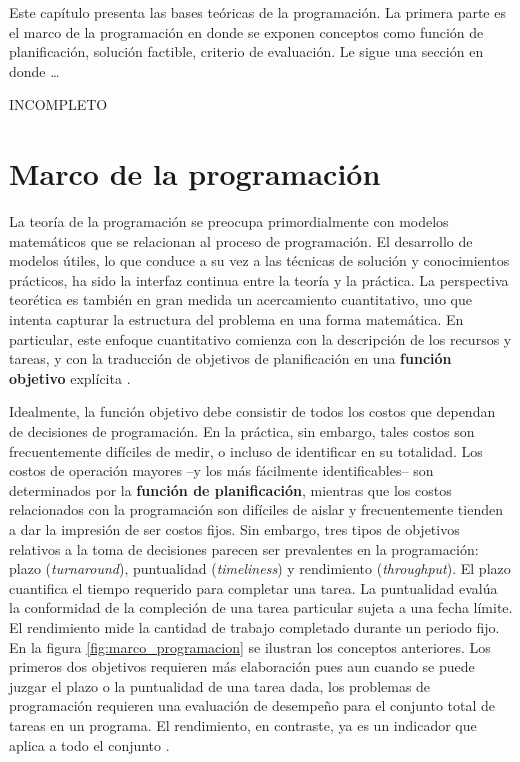 \documentclass[spanish,draft,12pt,headsepline,footsepline,paper=letter]{scrreprt}
\begin{document}
Este capítulo presenta las bases teóricas de la programación. La primera parte es el marco de la programación en donde se exponen conceptos como función de planificación, solución factible, criterio de evaluación.
%
Le sigue una sección en donde \ldots

INCOMPLETO

\section{Marco de la programación}

La teoría de la programación se preocupa primordialmente con modelos matemáticos que se relacionan al proceso de programación. El desarrollo de modelos útiles, lo que conduce a su vez a las técnicas de solución y conocimientos prácticos, ha sido la interfaz continua entre la teoría y la práctica. 
%
La perspectiva teorética es también en gran medida un acercamiento cuantitativo, uno que intenta capturar la estructura del problema en una forma matemática.
%
En particular, este enfoque cuantitativo comienza con la descripción de los recursos y tareas, y con la traducción de objetivos de planificación en una \textbf{función objetivo} explícita \citep[p.~3,~4]{Baker2009}.

Idealmente, la función objetivo debe consistir de todos los costos que dependan de decisiones de programación. En la práctica, sin embargo, tales costos son frecuentemente difíciles de medir, o incluso de identificar en su totalidad. Los costos de operación mayores –y los más fácilmente identificables– son determinados por la \textbf{función de planificación}, mientras que los costos relacionados con la programación son difíciles de aislar y frecuentemente tienden a dar la impresión de ser costos fijos. Sin embargo, tres tipos de objetivos relativos a la toma de decisiones parecen ser prevalentes en la programación: plazo (\textit{turnaround}), puntualidad (\textit{timeliness}) y rendimiento (\textit{throughput}). El plazo cuantifica el tiempo requerido para completar una tarea. La puntualidad evalúa la conformidad de la compleción de una tarea particular sujeta a una fecha límite. El rendimiento mide la cantidad de trabajo completado durante un periodo fijo. En la figura \ref{fig:marco_programacion} se ilustran los conceptos anteriores. Los primeros dos objetivos requieren más elaboración pues aun cuando se puede juzgar el plazo o la puntualidad de una tarea dada, los problemas de programación requieren una evaluación de desempeño para el conjunto total de tareas en un programa. El rendimiento, en contraste, ya es un indicador que aplica a todo el conjunto \citep[p.~4]{Baker2009}.
\end{document}
